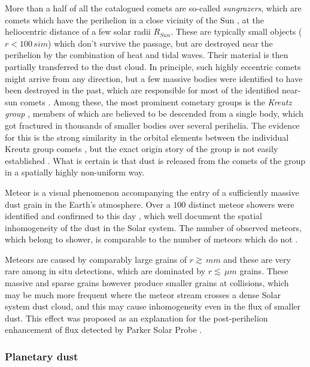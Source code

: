 More than a half of all the catalogued comets are so-called \textit{sungrazers}, which are comets which have the perihelion in a close vicinity of the Sun \citep{jones2018science}, at the heliocentric distance of a few solar radii $R_{Sun}$. These are typically small objects ($r<100 \, si{m}$) which don't survive the passage, but are destroyed near the perihelion by the combination of heat and tidal waves. Their material is then partially transferred to the dust cloud. In principle, such highly eccentric comets might arrive from any direction, but a few massive bodies were identified to have been destroyed in the past, which are responsible for most of the identified near-sun comets \citep{jones2018science}. Among these, the most prominent cometary groups is the \textit{Kreutz group} \citep{kreutz1888untersuchungen}, members of which are believed to be descended from a single body, which got fractured in thousands of smaller bodies over several perihelia. The evidence for this is the strong similarity in the orbital elements between the individual Kreutz group comets \citep{jones2018science}, but the exact origin story of the group is not easily established \citep{kalinicheva2017specific,fernandez2021origin}. What is certain is that dust is released from the comets of the group in a spatially highly non-uniform way. 

Meteor is a visual phenomenon accompanying the entry of a sufficiently massive dust grain in the Earth's atmosphere. Over a $100$ distinct meteor showers were identified and confirmed to this day \citep{jenniskens2020removing}, which well document the spatial inhomogeneity of the dust in the Solar system. The number of observed meteors, which belong to shower, is comparable to the number of meteors which do not \citep{jenniskens2016cams}. 

Meteors are caused by comparably large grains of $r \gtrsim \, \si{mm}$ and these are very rare among in situ detections, which are dominated by $r \lesssim \, \si{\mu m}$ grains. These massive and sparse grains however produce smaller grains at collisions, which may be much more frequent where the meteor stream crosses a dense Solar system dust cloud, and this may cause inhomogeneity even in the flux of smaller dust. This effect was proposed as an explanation for the post-perihelion enhancement of flux detected by Parker Solar Probe \citep{szalay2021collisional}. 

\subsubsection{Planetary dust}

